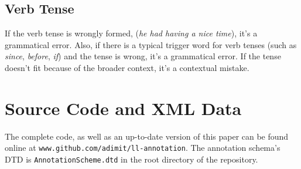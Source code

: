\documentclass{article}
\begin{document}
\subsection{Verb Tense}

If the verb tense is wrongly formed, (\textit{he had having a nice time}), it's
a grammatical error. Also, if there is a typical trigger word for verb tenses
(such as \textit{since}, \textit{before}, \textit{if}) and the tense is wrong,
it's a grammatical error. If the tense doesn't fit because of the broader
context, it's a contextual mistake.

\section{Source Code and XML Data}\label{appendix:github}

The complete code, as well as an up-to-date version of this paper can be found
online at \texttt{www.github.com/adimit/ll-annotation}. The annotation schema's
DTD is \texttt{AnnotationScheme.dtd} in the root directory of the repository.


\end{document}
